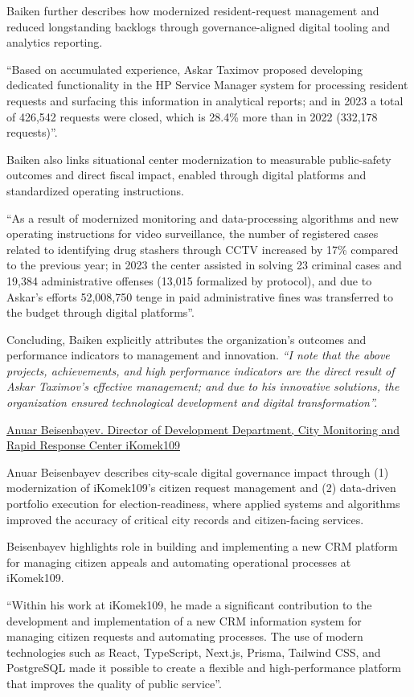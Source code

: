 Baiken further describes how \mrl{} modernized resident-request management and reduced longstanding backlogs through governance-aligned digital tooling and analytics reporting.
\begin{fullquote}
``Based on accumulated experience, Askar Taximov proposed developing dedicated functionality in the HP Service Manager system for processing resident requests and surfacing this information in analytical reports; and in 2023 a total of 426,542 requests were closed, which is 28.4\% more than in 2022 (332,178 requests)''.
\end{fullquote}

Baiken also links \mrls situational center modernization to measurable public-safety outcomes and direct fiscal impact, enabled through digital platforms and standardized operating instructions.
\begin{fullquote}
``As a result of modernized monitoring and data-processing algorithms and new operating instructions for video surveillance, the number of registered cases related to identifying drug stashers through CCTV increased by 17\% compared to the previous year; in 2023 the center assisted in solving 23 criminal cases and 19,384 administrative offenses (13,015 formalized by protocol), and due to Askar’s efforts 52,008,750 tenge in paid administrative fines was transferred to the budget through digital platforms''.
\end{fullquote}

Concluding, Baiken explicitly attributes the organization’s outcomes and performance indicators to \mrls management and innovation.
\emph{``I note that the above projects, achievements, and high performance indicators are the direct result of Askar Taximov’s effective management; and due to his innovative solutions, the organization ensured technological development and digital transformation''.}  




\bigskip
\noindent\underline{Anuar Beisenbayev. Director of Development Department, City Monitoring and Rapid Response Center iKomek109}

Anuar Beisenbayev describes \mrls city-scale digital governance impact through (1) modernization of iKomek109’s citizen request management and (2) data-driven portfolio execution for election-readiness, where \mrls applied systems and algorithms improved the accuracy of critical city records and citizen-facing services.

Beisenbayev highlights \mrls role in building and implementing a new CRM platform for managing citizen appeals and automating operational processes at iKomek109.
\begin{fullquote}
``Within his work at iKomek109, he made a significant contribution to the development and implementation of a new CRM information system for managing citizen requests and automating processes. The use of modern technologies such as React, TypeScript, Next.js, Prisma, Tailwind CSS, and PostgreSQL made it possible to create a flexible and high-performance platform that improves the quality of public service''.
\end{fullquote}

